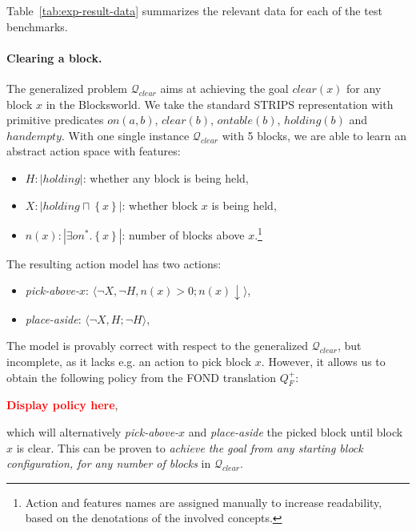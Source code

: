 \documentclass[letterpaper]{article} %
\newcommand{\tuple}[1]{\ensuremath{\langle #1 \rangle}}
\newcommand{\set}[1]{\ensuremath{\left\{#1 \right\}}}
\newcommand{\abs}[1]{\ensuremath{\left\vert{#1}\right\vert}}
\newcommand{\alert}[1]{\textcolor{red}{\bf #1}}
\newcommand{\Q}{\mathcal{Q}}
\begin{document}
Table~\ref{tab:exp-result-data} summarizes the relevant data for each of the test benchmarks.


\paragraph{Clearing a block.}
The generalized problem $\Q_{clear}$ aims at achieving the goal $clear(x)$ for any block $x$
in the Blocksworld.
We take the standard STRIPS representation with primitive predicates $on(a, b)$, $clear(b)$, $ontable(b)$, $holding(b)$ and $handempty$.
%
With one single instance $\Q_{clear}$ with 5 blocks, we are able to learn
an abstract action space with features:

\begin{itemize}
\item $H: \abs{holding}$: whether any block is being held,
\item $X: \abs{holding \sqcap \set{x}}$: whether block $x$ is being held,
\item $n(x): \abs{\exists on^* . \set{x}}$: number of blocks above $x$.\footnote{
Action and features names are assigned manually to increase readability, based on the denotations of the involved concepts.
}
\end{itemize}

\noindent The resulting action model has two actions:

\begin{itemize}
\item \emph{pick-above-$x$}: \tuple{\neg X, \neg H, n(x) > 0; n(x) \downarrow},
\item \emph{place-aside}: \tuple{\neg X, H; \neg H},
\end{itemize}


\noindent 
The model is provably correct with respect to the generalized $\Q_{clear}$, but incomplete, as it lacks e.g.
an action to pick block $x$. However, it allows us to obtain the following policy from the FOND translation $Q^+_F$:

\alert{Display policy here},

\noindent which will alternatively \emph{pick-above-$x$} and \emph{place-aside} the picked block 
until block $x$ is clear. This can be proven to \emph{achieve the goal from any starting block configuration, for any number of blocks} in 
$\Q_{clear}$.
\end{document}
